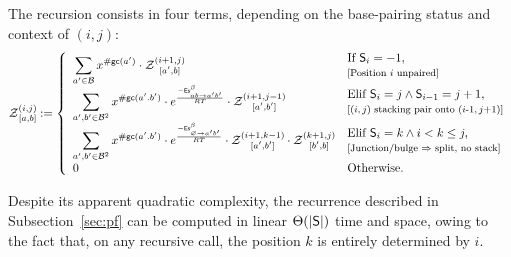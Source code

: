 The recursion consists in four terms, depending on the base-pairing status and context of $(i,j)$:
\begin{equation}
	\Z{i,j}{a,b}:=\left\{
  \begin{array}{ll}
  		\displaystyle
      \sum_{a'\in \B}  
      x^{\gc(a')}
      \cdot\Z{i+1,j}{a',b} &\begin{array}{@{}l@{}}\text{If }\Target_{i}=-1,\\ \text{\relsize{-1}[Position $i$ unpaired]}\end{array}\\
      \displaystyle
      \sum_{a',b'\in \B^2}
			 x^{\gc(a'.b')}
			 \cdot e^{\frac{-\ES^{\beta}_{ab \to a'b'}}{RT}}
			 \cdot \Z{i+1,j-1}{a',b'}&
\begin{array}{@{}l@{}}\text{Elif }\Target_i=j \land \Target_{i-1}=j+1,\\ \text{\relsize{-1}[$(i,j)$ stacking pair onto $(i$-$1,j$+$1)$]}\end{array}
			 \\
			 \displaystyle
      \sum_{a',b'\in \B^2}
      x^{\gc(a'.b')}
			\cdot e^{\frac{-\ES^{\beta}_{\varnothing\to a'b'}}{RT}}
      \cdot\Z{i+1,k-1}{a',b'}
      \cdot\Z{k+1,j}{b',b} & 
\begin{array}{@{}l@{}}\text{Elif }\Target_i=k \land i < k \leq j,\\
\text{\relsize{-1}[Junction/bulge $\Rightarrow$ split, no stack]}
\end{array}
\\
      0 &\text{Otherwise.}
	\end{array}\right.
\label{eq:Z_rec}
\end{equation}

Despite its apparent quadratic complexity, the recurrence described in Subsection~\ref{sec:pf} can be computed in linear $\Theta(|\text{\sf S}|)$ time and space, owing to the fact that, on any recursive call, the position $k$ is entirely determined by $i$. 

